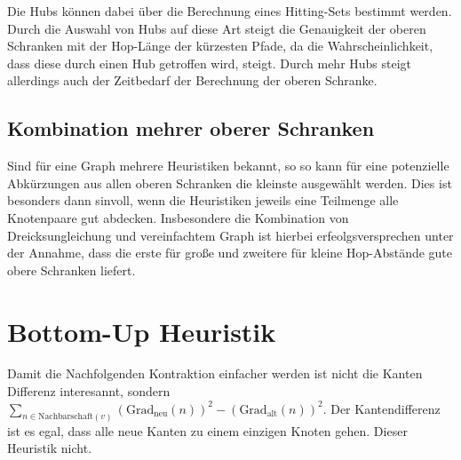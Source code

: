 Die Hubs können dabei über die Berechnung eines Hitting-Sets bestimmt werden.
Durch die Auswahl von Hubs auf diese Art steigt die Genauigkeit der oberen Schranken mit der Hop-Länge der kürzesten Pfade, da die Wahrscheinlichkeit, dass diese durch einen Hub getroffen wird, steigt.
Durch mehr Hubs steigt allerdings auch der Zeitbedarf der Berechnung der oberen Schranke.

\subsection{Kombination mehrer oberer Schranken}
Sind für eine Graph mehrere Heuristiken bekannt, so so kann für eine potenzielle Abkürzungen aus allen oberen Schranken die kleinste ausgewählt werden.
Dies ist besonders dann sinvoll, wenn die Heuristiken jeweils eine Teilmenge alle Knotenpaare gut abdecken.
Insbesondere die Kombination von Dreicksungleichung und vereinfachtem Graph ist hierbei erfeolgsversprechen unter der Annahme, dass die erste für große und zweitere für kleine Hop-Abstände gute obere Schranken liefert.

\section{Bottom-Up Heuristik}

Damit die Nachfolgenden Kontraktion einfacher werden ist nicht die Kanten Differenz interesannt, sondern $\sum_{n \in \text{Nachbarschaft}(v)} (\text{Grad}_\text{neu}(n))^2 - (\text{Grad}_\text{alt}(n))^2$.
Der Kantendifferenz ist es egal, dass alle neue Kanten zu einem einzigen Knoten gehen. Dieser Heuristik nicht.

